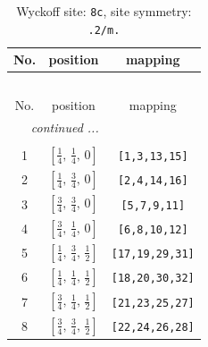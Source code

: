 \documentclass[fleqn,8pt]{jsarticle}
\begin{document}
\renewcommand{\arraystretch}{1.2}
\begin{longtable}{ccc}
\caption{Wyckoff site: {\tt 8c}, site symmetry: {\tt .2/m.}}
 \\
 \hline \hline
No. & position & mapping \\ \hline \endfirsthead

\multicolumn{2}{l}{\tablename\ \thetable{}} \\
 \hline \hline
No. & position & mapping \\ \hline \endhead

 \hline \hline
\multicolumn{2}{r}{\footnotesize\it continued ...} \\ \endfoot

 \hline \hline
\multicolumn{2}{r}{} \\ \endlastfoot

1 & $\left[ \frac{1}{4},\, \frac{1}{4},\, 0 \right]$ & {\tt [1,3,13,15]} \\ \hline
2 & $\left[ \frac{1}{4},\, \frac{3}{4},\, 0 \right]$ & {\tt [2,4,14,16]} \\ \hline
3 & $\left[ \frac{3}{4},\, \frac{3}{4},\, 0 \right]$ & {\tt [5,7,9,11]} \\ \hline
4 & $\left[ \frac{3}{4},\, \frac{1}{4},\, 0 \right]$ & {\tt [6,8,10,12]} \\ \hline
5 & $\left[ \frac{1}{4},\, \frac{3}{4},\, \frac{1}{2} \right]$ & {\tt [17,19,29,31]} \\ \hline
6 & $\left[ \frac{1}{4},\, \frac{1}{4},\, \frac{1}{2} \right]$ & {\tt [18,20,30,32]} \\ \hline
7 & $\left[ \frac{3}{4},\, \frac{1}{4},\, \frac{1}{2} \right]$ & {\tt [21,23,25,27]} \\ \hline
8 & $\left[ \frac{3}{4},\, \frac{3}{4},\, \frac{1}{2} \right]$ & {\tt [22,24,26,28]} \\
\end{longtable}
\renewcommand{\arraystretch}{1.2}
\end{document}
